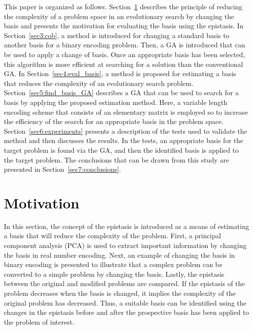 This paper is organized as follows. Section~\ref{sec2:motivation} describes the principle of reducing the complexity of a problem space in an evolutionary search by changing the basis and presents the motivation for evaluating the basis using the epistasis. In Section~\ref{sec3:cob}, a method is introduced for changing a standard basis to another basis for a binary encoding problem. Then, a GA is introduced that can be used to apply a change of basis. Once an appropriate basis has been selected, this algorithm is more efficient at searching for a solution than the conventional GA. In Section~\ref{sec4:eval_basis}, a method is proposed for estimating a basis that reduces the complexity of an evolutionary search problem. Section~\ref{sec5:find_basis_GA} describes a GA that can be used to search for a basis by applying the proposed estimation method. Here, a variable length encoding scheme that consists of an elementary matrix is employed so to increase the efficiency of the search for an appropriate basis in the problem space. Section~\ref{sec6:experiments} presents a description of the tests used to validate the method and then discusses the results. In the tests, an appropriate basis for the target problem is found via the GA, and then the identified basis is applied to the target problem. The conclusions that can be drawn from this study are presented in Section~\ref{sec7:conclusions}.


\section{Motivation} \label{sec2:motivation}
In this section, the concept of the epistasis is introduced as a means of estimating a basis that will reduce the complexity of the problem. First, a principal component analysis (PCA) is used to extract important information by changing the basis in real number encoding. Next, an example of changing the basis in binary encoding is presented to illustrate that a complex problem can be converted to a simple problem by changing the basis. Lastly, the epistasis between the original and modified problems are compared. If the epistasis of the problem decreases when the basis is changed, it implies the complexity of the original problem has decreased. Thus, a suitable basis can be identified using the changes in the epistasis before and after the prospective basis has been applied to the problem of interest.

